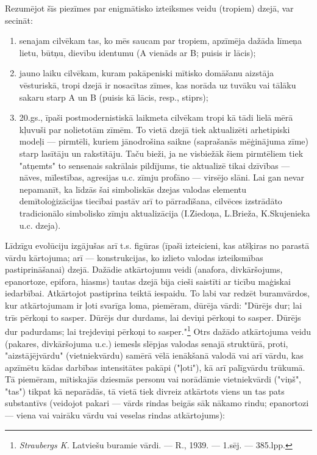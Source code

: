 \documentclass[11pt]{article}
\begin{document}
{\color{red}
Rezumējot šīs piezīmes par enigmātisko izteiksmes
veidu (tropiem) dzejā, var secināt:
\begin{enumerate}[1)]
\item senajam cilvēkam tas, ko mēs saucam par
tropiem, apzīmēja dažāda līmeņa lietu, būtņu,
dievību identumu (A vienāds ar B; puisis ir lācis);
\item jauno laiku cilvēkam, kuram pakāpeniski
mītisko domāšanu aizstāja vēsturiskā, tropi dzejā ir
nosacītas zīmes, kas norāda uz tuvāku vai tālāku
sakaru starp A un B (puisis kā lācis, resp., stiprs);
\item 20.gs., īpaši postmodernistiskā laikmeta cilvēkam
tropi kā tādi lielā mērā kļuvuši par nolietotām zīmēm.
To vietā dzejā tiek aktualizēti arhetipiski
modeļi --- pirmtēli, kuriem jānodrošina saikne
(saprašanās mēģinājuma zīme) starp lasītāju un
rakstītāju. Taču bieži, ja ne visbiežāk šiem
pirmtēliem tiek "atņemts" to sensenais sakrālais
pildījums, tie aktualizē tikai dzīvības --- nāves,
mīlestības, agresijas u.c. zīmju profāno --- virsējo
slāni. Lai gan nevar nepamanīt, ka
līdzās šai simboliskās dzejas valodas elementu
demītoloģizācijas tiecībai pastāv arī
to pārradīšana, cilvēces izstrādāto tradicionālo
simbolisko zīmju aktualizācija (I.Ziedoņa, L.Brieža,
K.Skujenieka u.c. dzeja).
\end{enumerate}
}

Līdzīgu evolūciju izgājušas arī t.s. figūras (īpaši
izteicieni, kas atšķiras no parastā vārdu kārtojuma; arī
--- konstrukcijas, ko izlieto valodas izteiksmības
pastiprināšanai) dzejā. Dažādie atkārtojumu veidi
(anafora, divkāršojums, epanortoze, epifora,
hiasms) tautas dzejā bija cieši saistīti
ar ticību maģiskai iedarbībai. Atkārtojot pastiprina
teiktā iespaidu. To labi var redzēt buramvārdos,
kur atkārtojumam ir ļoti svarīga loma, piemēram, dūrēja
vārdi: "Dūrējs dur; lai trīs pērkoņi to sasper. Dūrējs dur
durdams, lai deviņi pērkoņi to sasper. Dūrējs
dur padurdams; lai trejdeviņi pērkoņi to
sasper."\footnote{{\em Straubergs K.} Latviešu
buramie vārdi. --- R., 1939. --- 1.sēj. ---
385.lpp.} Otrs dažādo atkārtojuma veidu
(pakares, divkāršojuma u.c.) iemesls slēpjas
valodas senajā struktūrā, proti,
"aizstājējvārdu" (vietniekvārdu) samērā
vēlā ienākšanā valodā vai arī vārdu, kas apzīmētu
kādas darbības intensitātes pakāpi ("ļoti"), kā
arī palīgvārdu trūkumā.
Tā piemēram, mītiskajās dziesmās personu vai
norādāmie vietniekvārdi ("viņš", "tas") tikpat kā
neparādās, tā vietā tiek divreiz atkārtots viens
un tas pats substantīvs (veidojot pakari --- vārds
rindas beigās sāk nākamo rindu;
epanortozi --- viena vai vairāku vārdu vai veselas
rindas atkārtojums):
\end{document}
